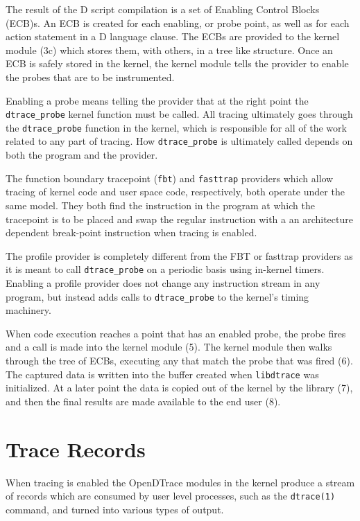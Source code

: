The result of the D script compilation is a set of Enabling Control Blocks
(ECB)s.  An ECB is created for each enabling, or probe point, as well
as for each action statement in a D language clause.
The ECBs are provided to the kernel module (3c) which stores them,
with others, in a tree like structure. Once an ECB is safely stored in
the kernel, the kernel module tells the provider to enable the probes
that are to be instrumented.

Enabling a probe means telling the provider that at the right point
the \verb|dtrace_probe| kernel function must be called.  All tracing
ultimately goes through the \verb|dtrace_probe| function in the
kernel, which is responsible for all of the work related to any part
of tracing.  How \verb|dtrace_probe| is ultimately called depends on
both the program and the provider.

The function boundary tracepoint (\verb|fbt|) and \verb|fasttrap|
providers which allow tracing of kernel code and user space code,
respectively, both operate under the same model.  They both find the
instruction in the program at which the tracepoint is to be placed and
swap the regular instruction with a an architecture dependent
break-point instruction when tracing is enabled.

The profile provider is completely different from the FBT or fasttrap
providers as it is meant to call \verb|dtrace_probe| on a periodic
basis using in-kernel timers.  Enabling a profile provider does not
change any instruction stream in any program, but instead adds calls
to \verb|dtrace_probe| to the kernel's timing machinery.

When code execution reaches a point that has an enabled probe, the
probe fires and a call is made into the kernel module (5). The kernel
module then walks through the tree of ECBs, executing any that match
the probe that was fired (6). The captured data is written into the
buffer created when \texttt{libdtrace} was initialized. At a later
point the data is copied out of the kernel by the library (7), and
then the final results are made available to the end user (8).

\section{Trace Records}
\label{sec:trace-records}

When tracing is enabled the OpenDTrace modules in the kernel produce a
stream of records which are consumed by user level processes, such as
the \verb|dtrace(1)| command, and turned into various types of output.

